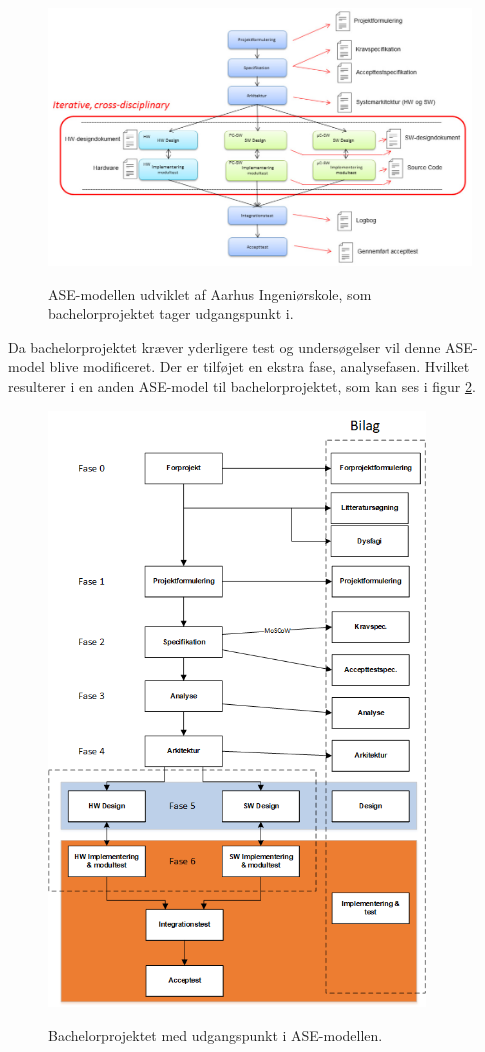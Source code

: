 \begin{figure}[H] 
\centering
{\includegraphics[width=\linewidth]
{Figure/asemodel}}
\caption{ASE-modellen udviklet af Aarhus Ingeniørskole, som bachelorprojektet tager udgangspunkt i.}
\label{asemodel}
\end{figure}



Da bachelorprojektet kræver yderligere test og undersøgelser vil denne ASE-model blive modificeret. Der er tilføjet en ekstra fase, analysefasen. Hvilket resulterer i en anden ASE-model til bachelorprojektet, som kan ses i figur \ref{procesVoresASE}.


\begin{figure}[H] 
\centering
{\includegraphics[width=10cm]
{Figure/procesVoresASE}}
\caption{Bachelorprojektet med udgangspunkt i ASE-modellen.}
\label{procesVoresASE}
\end{figure}

